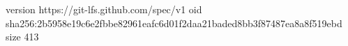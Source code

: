 version https://git-lfs.github.com/spec/v1
oid sha256:2b5958e19c6e2fbbe82961eafc6d01f2daa21baded8bb3f87487ea8a8f519ebd
size 413
